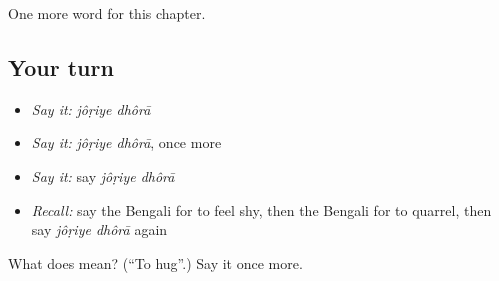 \begin{grammarlens}[title={What you've built}]
One more word for this chapter.
\end{grammarlens}

\subsection*{Your turn}
\begin{itemize}
\raggedright
  \item \emph{Say it:} \emph{jôṛiye dhôrā}
  \item \emph{Say it:} \emph{jôṛiye dhôrā}, once more
  \item \emph{Say it:} say \emph{jôṛiye dhôrā}
  \item \emph{Recall:} say the Bengali for to feel shy, then the Bengali for to quarrel, then say \emph{jôṛiye dhôrā} again
\end{itemize}

\begin{tcolorbox}[breakable,colback=teal!4,colframe=teal!35!black,title={Before you move on}]
What does   mean? (\textquotedblleft{}To hug\textquotedblright{}.) Say it once more.
\end{tcolorbox}

